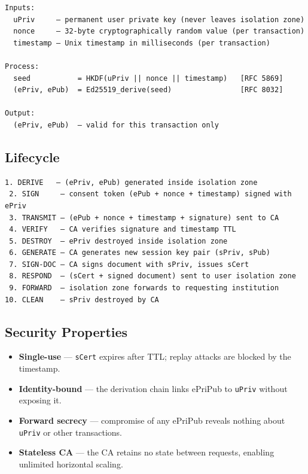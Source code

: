 \documentclass[11pt,a4paper]{article}
\begin{document}
\begin{lstlisting}[style=protocol]
Inputs:
  uPriv     — permanent user private key (never leaves isolation zone)
  nonce     — 32-byte cryptographically random value (per transaction)
  timestamp — Unix timestamp in milliseconds (per transaction)

Process:
  seed           = HKDF(uPriv || nonce || timestamp)   [RFC 5869]
  (ePriv, ePub)  = Ed25519_derive(seed)                [RFC 8032]

Output:
  (ePriv, ePub)  — valid for this transaction only
\end{lstlisting}

\subsection{Lifecycle}

\begin{lstlisting}[style=protocol]
 1. DERIVE   — (ePriv, ePub) generated inside isolation zone
 2. SIGN     — consent token (ePub + nonce + timestamp) signed with ePriv
 3. TRANSMIT — (ePub + nonce + timestamp + signature) sent to CA
 4. VERIFY   — CA verifies signature and timestamp TTL
 5. DESTROY  — ePriv destroyed inside isolation zone
 6. GENERATE — CA generates new session key pair (sPriv, sPub)
 7. SIGN-DOC — CA signs document with sPriv, issues sCert
 8. RESPOND  — (sCert + signed document) sent to user isolation zone
 9. FORWARD  — isolation zone forwards to requesting institution
10. CLEAN    — sPriv destroyed by CA
\end{lstlisting}

\subsection{Security Properties}

\begin{itemize}
  \item \textbf{Single-use} --- \texttt{sCert} expires after TTL; replay
        attacks are blocked by the timestamp.
  \item \textbf{Identity-bound} --- the derivation chain links ePriPub to
        \texttt{uPriv} without exposing it.
  \item \textbf{Forward secrecy} --- compromise of any ePriPub reveals
        nothing about \texttt{uPriv} or other transactions.
  \item \textbf{Stateless CA} --- the CA retains no state between requests,
        enabling unlimited horizontal scaling.
\end{itemize}
\end{document}
